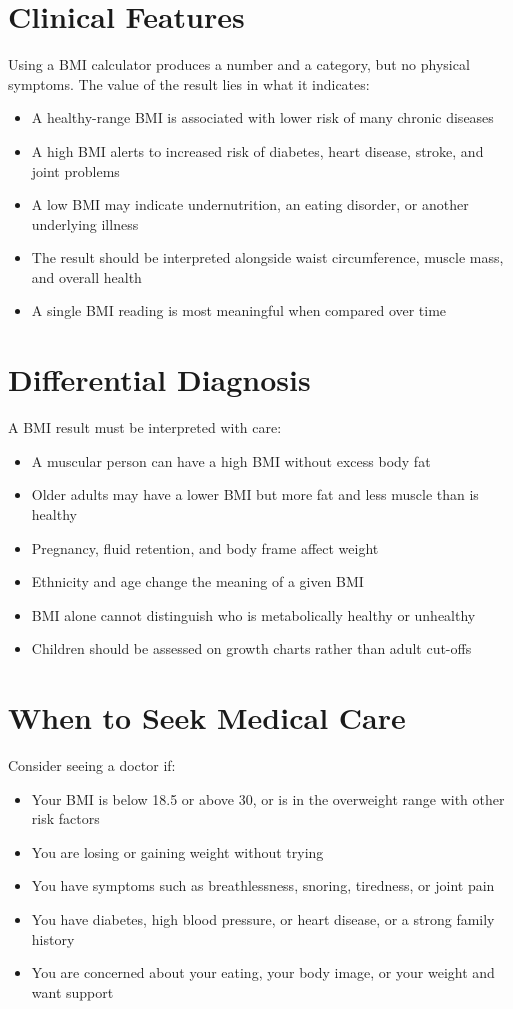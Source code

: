 \section*{Clinical Features}
Using a BMI calculator produces a number and a category, but no physical symptoms. The value of the result lies in what it indicates:

\begin{itemize}
    \item A healthy-range BMI is associated with lower risk of many chronic diseases
    \item A high BMI alerts to increased risk of diabetes, heart disease, stroke, and joint problems
    \item A low BMI may indicate undernutrition, an eating disorder, or another underlying illness
    \item The result should be interpreted alongside waist circumference, muscle mass, and overall health
    \item A single BMI reading is most meaningful when compared over time
\end{itemize}

\section*{Differential Diagnosis}
A BMI result must be interpreted with care:

\begin{itemize}
    \item A muscular person can have a high BMI without excess body fat
    \item Older adults may have a lower BMI but more fat and less muscle than is healthy
    \item Pregnancy, fluid retention, and body frame affect weight
    \item Ethnicity and age change the meaning of a given BMI
    \item BMI alone cannot distinguish who is metabolically healthy or unhealthy
    \item Children should be assessed on growth charts rather than adult cut-offs
\end{itemize}

\section*{When to Seek Medical Care}
Consider seeing a doctor if:

\begin{itemize}
    \item Your BMI is below 18.5 or above 30, or is in the overweight range with other risk factors
    \item You are losing or gaining weight without trying
    \item You have symptoms such as breathlessness, snoring, tiredness, or joint pain
    \item You have diabetes, high blood pressure, or heart disease, or a strong family history
    \item You are concerned about your eating, your body image, or your weight and want support
\end{itemize}

